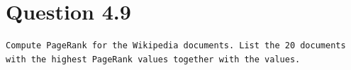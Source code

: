 \documentclass[11pt]{article}
\newenvironment{code}{\captionsetup{type=listing}}{}
\begin{document}
\begin{code}
 \label{code:vcp}
	
\end{code}
\begin{code}
 \label{code:vcr}
	
\end{code}
\newpage
\section{Question 4.9}
\label{q:pr}
\begin{verbatim}
Compute PageRank for the Wikipedia documents. List the 20 documents
with the highest PageRank values together with the values.
\end{verbatim}
\end{document}
